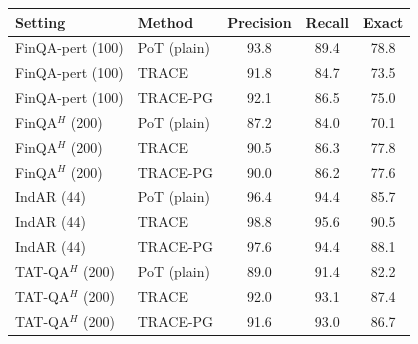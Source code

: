 \begin{tabular}{llccc}
\toprule
Setting & Method & Precision & Recall & Exact \\
\midrule
FinQA-pert (100) & PoT (plain) & 93.8 & 89.4 & 78.8 \\
FinQA-pert (100) & TRACE & 91.8 & 84.7 & 73.5 \\
FinQA-pert (100) & TRACE-PG & 92.1 & 86.5 & 75.0 \\
FinQA$^{H}$ (200) & PoT (plain) & 87.2 & 84.0 & 70.1 \\
FinQA$^{H}$ (200) & TRACE & 90.5 & 86.3 & 77.8 \\
FinQA$^{H}$ (200) & TRACE-PG & 90.0 & 86.2 & 77.6 \\
IndAR (44) & PoT (plain) & 96.4 & 94.4 & 85.7 \\
IndAR (44) & TRACE & 98.8 & 95.6 & 90.5 \\
IndAR (44) & TRACE-PG & 97.6 & 94.4 & 88.1 \\
TAT-QA$^{H}$ (200) & PoT (plain) & 89.0 & 91.4 & 82.2 \\
TAT-QA$^{H}$ (200) & TRACE & 92.0 & 93.1 & 87.4 \\
TAT-QA$^{H}$ (200) & TRACE-PG & 91.6 & 93.0 & 86.7 \\
\bottomrule
\end{tabular}
